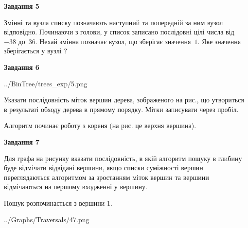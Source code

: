 \documentclass[12pt, ukrainian]{article}
\begin{document}
{\begin {large}
{\begin {center}\textbf{Завдання 5}\end {center}}\par
Змінні  та  вузла списку позначають наступний та попередній за ним вузол відповідно. Починаючи з голови, у список записано послідовні цілі числа від~$-38$ до~$36$. Нехай змінна  позначає вузол, що зберігає значення~$1$.
Яке значення зберігається у вузлі  ?\par
\newpage

{\begin {center}\textbf{Завдання 6}\end {center}}\par

\begin{center}
	{../BinTree/trees_exp/5.png}
\end{center}
Указати послідовність міток вершин дерева, зображеного на рис., що утвориться в результаті обходу дерева в прямому порядку. Мітки записувати через пробіл.\par Алгоритм починає роботу з кореня (на рис. це верхня вершина).\par
\newpage

{\begin {center}\textbf{Завдання 7}\end {center}}\par
Для графа на рисунку вказати послідовність, в якій алгоритм пошуку в глибину буде відмічати відвідані вершини, якщо списки суміжності вершин переглядаються алгоритмом за зростанням міток вершин та вершини відмічаються на першому вход\-женні у вершину.\par
Пошук розпочинається з вершини 1.\par

\begin{center}
	{../Graphs/Traversals/47.png}
\end{center}\par
\newpage


\end{large}}
\end{document}
